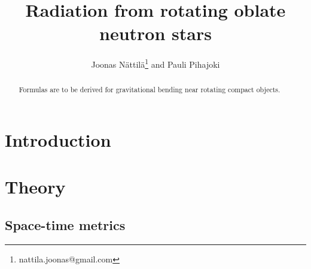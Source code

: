 \documentclass[iop, usenatbib]{emulateapj}
\begin{document}
\title{Radiation from rotating oblate neutron stars}

\author{Joonas N\"attil\"a\thanks{nattila.joonas@gmail.com}
and Pauli Pihajoki}

\affil{}

\begin{abstract}
Formulas are to be derived for gravitational bending near rotating compact objects.
\end{abstract}

\section{Introduction}
\clearpage

\section{Theory}

\subsection{Space-time metrics}
\end{document}
